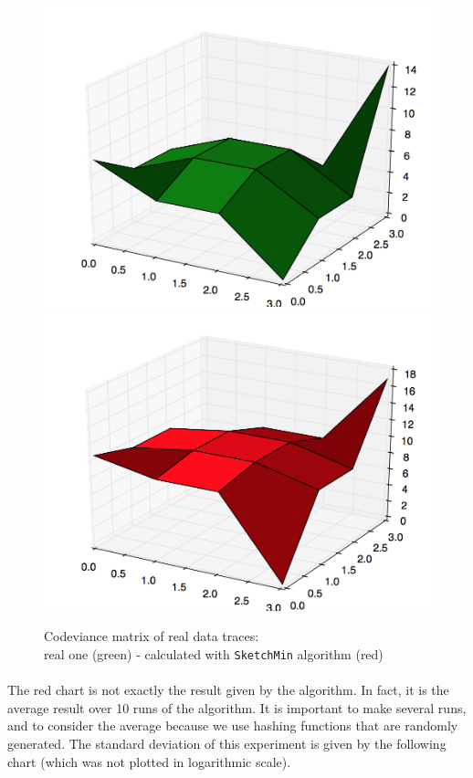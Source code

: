 \documentclass[a4paper]{article}%
\begin{document}
\begin{figure}[H]
	\center
	\includegraphics[scale=0.23]{realtests10times_real1.png}
	\includegraphics[scale=0.23]{realtests10times_sketchmin1.png}
	\caption{\footnotesize Codeviance matrix of real data traces: \\ real one (green) - calculated with \texttt{SketchMin} algorithm (red)}
	\label{ref:exp_real}
\end{figure}

\paragraph{}The red chart is not exactly the result given by the algorithm. In fact, it is the average result over 10 runs of the algorithm. It is important to make several runs, and to consider the average because we use hashing functions that are randomly generated. The standard deviation of this experiment is given by the following chart (which was not plotted in logarithmic scale).
\end{document}
